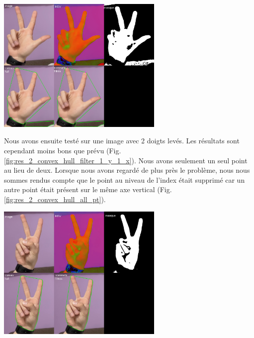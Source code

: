 \documentclass[11pt]{article}
\begin{document}
\begin{center}
    \includegraphics[width=0.6\textwidth]{images/res_3_convex_hull_filter_1_y_1_x.png}
    \label{fig:res_3_convex_hull_filter_1_y_1_x}
\end{center}
\newpage

Nous avons ensuite testé sur une image avec 2 doigts levés.
Les résultats sont cependant moins bons que prévu (Fig. \ref{fig:res_2_convex_hull_filter_1_y_1_x}). Nous avons seulement un seul point au lieu de deux. Lorsque nous avons regardé de plus près le problème, nous nous sommes rendus compte que le point au niveau de l'index était supprimé car un autre point était présent sur le même axe vertical (Fig. \ref{fig:res_2_convex_hull_all_pt}).
\begin{center}
    \includegraphics[width=0.6\textwidth]{images/res_2_convex_hull_filter_1_y_1_x.png}
    \label{fig:res_2_convex_hull_filter_1_y_1_x}
\end{center}
\bigbreak
\end{document}
